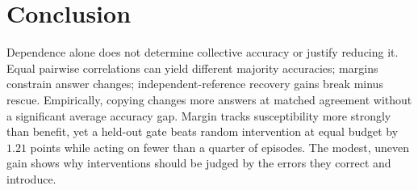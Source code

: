 \documentclass[11pt,a4paper]{article}
\theoremstyle{definition}
\begin{document}
\section{Conclusion}
\label{sec:conclusion}

Dependence alone does not determine collective accuracy or justify reducing it. Equal pairwise correlations can yield different majority accuracies; margins constrain answer changes; independent-reference recovery gains break minus rescue. Empirically, copying changes more answers at matched agreement without a significant average accuracy gap. Margin tracks susceptibility more strongly than benefit, yet a held-out gate beats random intervention at equal budget by $1.21$ points while acting on fewer than a quarter of episodes. The modest, uneven gain shows why interventions should be judged by the errors they correct and introduce.

\clearpage




\clearpage

\appendix

\raggedbottom

\setlength{\parskip}{0pt}
\setlength{\smallskipamount}{2pt plus 1pt minus 1pt}
\setlength{\medskipamount}{3pt plus 1pt minus 1pt}
\setlength{\abovedisplayskip}{5pt plus 1pt minus 1pt}
\setlength{\belowdisplayskip}{5pt plus 1pt minus 1pt}
\setlength{\abovedisplayshortskip}{2pt plus 1pt}
\setlength{\belowdisplayshortskip}{4pt plus 1pt minus 1pt}
\setlength{\textfloatsep}{5pt plus 1pt minus 1pt}
\setlength{\floatsep}{3pt plus 1pt minus 1pt}
\setlength{\intextsep}{7pt plus 1pt minus 1pt}
\setlength{\partopsep}{0pt}
\setlength{\aboverulesep}{0.4ex}
\setlength{\belowrulesep}{0.4ex}
\setlength{\dbltextfloatsep}{5pt plus 1pt minus 1pt}
\setlength{\dblfloatsep}{3pt plus 1pt minus 1pt}
\setlength{\abovecaptionskip}{4pt}
\setlength{\belowcaptionskip}{3pt}
\setcounter{topnumber}{4}
\setcounter{totalnumber}{6}
\setcounter{dbltopnumber}{4}
\renewcommand{\topfraction}{0.95}
\renewcommand{\textfraction}{0.05}
\renewcommand{\floatpagefraction}{0.60}
\renewcommand{\dbltopfraction}{0.95}
\renewcommand{\dblfloatpagefraction}{0.60}
\makeatletter
\setlength{\@fptop}{0pt}
\setlength{\@fpsep}{3pt}
\setlength{\@fpbot}{0pt plus 1fil}
\setlength{\@dblfptop}{0pt}
\setlength{\@dblfpsep}{3pt}
\setlength{\@dblfpbot}{0pt plus 1fil}
\makeatother
\end{document}
